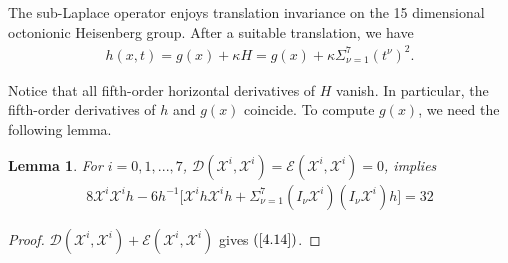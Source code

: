 \documentclass[reqno,12pt]{amsart}
\numberwithin{equation}{section}
\theoremstyle{plain}
\newtheorem{lemma}[theorem]{Lemma}
\theoremstyle{definition}
\begin{document}
The sub-Laplace operator enjoys translation invariance on the 15 dimensional octonionic Heisenberg group. After a suitable translation, we have
\begin{align}
    h(x,t)=g(x)+\kappa H=g(x)+\kappa \Sigma_{\nu=1}^7 (t^\nu)^2.
\end{align}


Notice that all fifth-order horizontal derivatives of $H$ vanish. In particular, the fifth-order derivatives of $h$ and $g(x)$ coincide. To compute $g(x)$, we need the following lemma.


\begin{lemma}\label{lemma 4.5}
    For $i=0,1,...,7$, $\mathcal{D}(\mathscr{X}^i,\mathscr{X}^i)=\mathcal{E}(\mathscr{X}^i,\mathscr{X}^i)=0$, implies
    \begin{align}\label{4.14}
        8\mathscr{X}^i\mathscr{X}^ih-6h^{-1}\bigg[\mathscr{X}^ih \mathscr{X}^ih+\Sigma_{\nu=1}^7(I_\nu \mathscr{X}^i)(I_\nu \mathscr{X}^i) h\bigg]=32 
    \end{align}







\end{lemma}
\begin{proof}
    $\mathcal{D}(\mathscr{X}^i,\mathscr{X}^i)+\mathcal{E}(\mathscr{X}^i,\mathscr{X}^i)$ gives $(\ref{4.14})$.
         
\end{proof}
\end{document}
